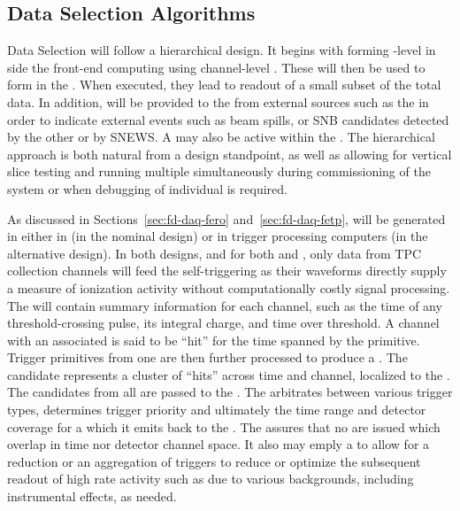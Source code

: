 

\subsection{Data Selection Algorithms}
\label{sec:fd-daq-sel}


Data Selection will follow a hierarchical design. 
It begins with forming -level  in
side the  front-end computing using channel-level
. 
These will then be used to form  
in the .
When executed, they lead to readout of a small subset of the total
data. 
In addition,  will be provided to the
 from external sources such as the  in order to
indicate external events such as beam spills, or SNB candidates
detected by the other  or by SNEWS.
A  may also be active within the . 
The hierarchical approach is both natural from a design standpoint, as
well as allowing for vertical slice testing and running multiple
 simultaneously during commissioning of the system or
when  debugging of individual  is required.

As discussed in Sections~\ref{sec:fd-daq-fero}
and~\ref{sec:fd-daq-fetp},  will be generated in
either in  (in the nominal design) or in trigger
processing computers (in the alternative design). 
In both designs, and for both  and 
, only data from TPC collection channels will feed
the self-triggering as their waveforms directly supply a measure of
ionization activity without computationally costly signal processing.
The  will contain summary information for each
channel, such as the time of any threshold-crossing pulse, its
integral charge, and time over threshold. 
A channel with an associated  is said to be
``hit'' for the time spanned by the primitive. 
Trigger primitives from one  are then further processed
to produce a . 
The candidate represents a cluster of ``hits'' across time and
channel, localized to the .
The candidates from all  are passed to the
.
The  arbitrates between various trigger types, determines
trigger priority and ultimately the time range and detector coverage
for a  which it emits back to the .
The  assures that no  are issued which
overlap in time nor detector channel space.
It also may emply a  to allow for a reduction or an
aggregation of triggers to reduce or optimize the subsequent readout
of high rate activity such as due to various backgrounds, including
instrumental effects, as needed.

